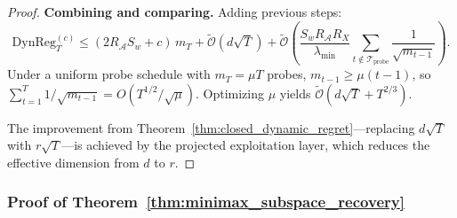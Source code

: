 \documentclass{article}
\newcommand{\cA}{\mathcal{A}}
\newcommand{\cTprobe}{\mathcal{T}_{\mathrm{probe}}}
\newcommand{\tilO}{\widetilde{\mathcal{O}}}
\newcommand{\DynReg}{\mathrm{DynReg}}
\begin{document}
\begin{proof}
\textbf{Combining and comparing.}
Adding previous steps:
\[
\DynReg_T^{(c)} \le (2R_{\cA} S_w + c)\,m_T + \tilO(d\sqrt{T}) + \tilO\!\left(\frac{S_w R_{\cA} R_X}{\lambda_{\min}}\sum_{t \notin \cTprobe}\frac{1}{\sqrt{m_{t-1}}}\right).
\]
Under a uniform probe schedule with $m_T = \mu T$ probes, $m_{t-1} \ge \mu(t-1)$, so $\sum_{t=1}^T 1/\sqrt{m_{t-1}} = O(T^{1/2}/\sqrt{\mu})$.  Optimizing $\mu$ yields $\tilO(d\sqrt{T} + T^{2/3})$.

The improvement from Theorem~\ref{thm:closed_dynamic_regret}---replacing $d\sqrt{T}$ with $r\sqrt{T}$---is achieved by the projected exploitation layer, which reduces the effective dimension from $d$ to $r$.
\end{proof}


\subsubsection{Proof of Theorem~\ref{thm:minimax_subspace_recovery}}
\label{proof:minimax_subspace_recovery}
\end{document}
